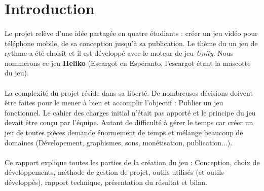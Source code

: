 \section{Introduction}

\paragraph{}
Le projet relève d'une idée partagée en quatre étudiants : créer un jeu vidéo pour téléphone mobile, de sa conception jusqu'à sa publication. Le thème du un jeu de rythme a été choisit et il est développé avec le moteur de jeu \textit{Unity}. Nous nommerons ce jeu \textbf{Heliko} (Escargot en Espéranto, l'escargot étant la mascotte du jeu).

\paragraph{}
La complexité du projet réside dans sa liberté. De nombreuses décisions doivent être faites pour le mener à bien et accomplir l'objectif : Publier un jeu fonctionnel. Le cahier des charges initial n'était pas apporté et le principe du jeu devait être conçu par l'équipe. Autant de difficulté à gérer le temps car créer un jeu de toutes pièces demande énormement de temps et mélange beaucoup de domaines (Dévelopement, graphismes, sons, monétisation, publication...).

\paragraph{}
Ce rapport explique toutes les parties de la création du jeu : Conception, choix de développements, méthode de gestion de projet, outils utilisés (et outils développés), rapport technique, présentation du résultat et bilan.
